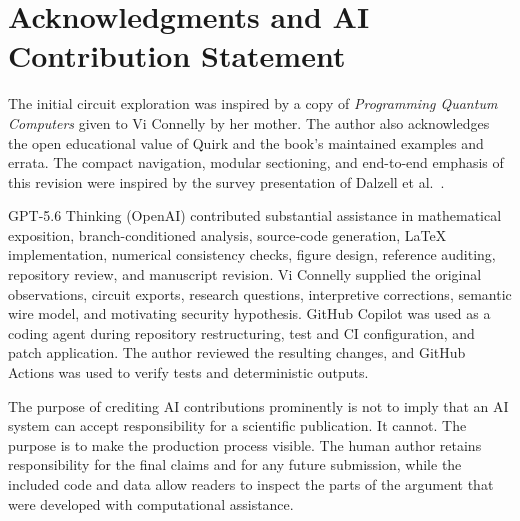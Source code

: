 \section*{Acknowledgments and AI Contribution Statement}

The initial circuit exploration was inspired by a copy of
\emph{Programming Quantum Computers} given to Vi Connelly by her mother. The
author also acknowledges the open educational value of Quirk and the book's
maintained examples and errata. The compact navigation, modular sectioning, and
end-to-end emphasis of this revision were inspired by the survey presentation
of Dalzell et al.~\cite{dalzell2024survey}.

GPT-5.6 Thinking (OpenAI) contributed substantial assistance in mathematical
exposition, branch-conditioned analysis, source-code generation, LaTeX
implementation, numerical consistency checks, figure design, reference
auditing, repository review, and manuscript revision. Vi Connelly supplied the
original observations, circuit exports, research questions, interpretive
corrections, semantic wire model, and motivating security hypothesis. GitHub
Copilot was used as a coding agent during repository restructuring, test and CI
configuration, and patch application. The author reviewed the resulting changes,
and GitHub Actions was used to verify tests and deterministic outputs.

The purpose of crediting AI contributions prominently is not to imply that an AI
system can accept responsibility for a scientific publication. It cannot. The
purpose is to make the production process visible. The human author retains
responsibility for the final claims and for any future submission, while the
included code and data allow readers to inspect the parts of the argument that
were developed with computational assistance.
